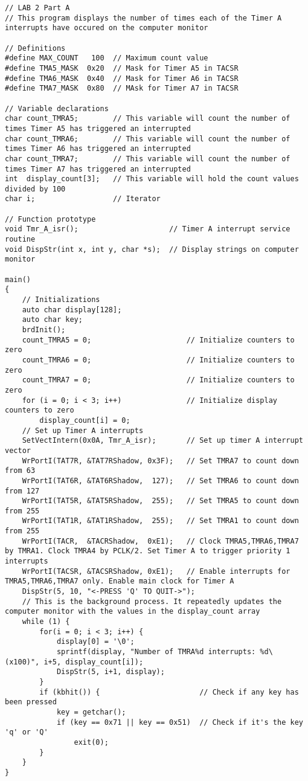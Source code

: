 
\begin{lstlisting}[frame=single]
// LAB 2 Part A 
// This program displays the number of times each of the Timer A interrupts have occured on the computer monitor

// Definitions
#define MAX_COUNT   100  // Maximum count value
#define TMA5_MASK  0x20  // Mask for Timer A5 in TACSR
#define TMA6_MASK  0x40  // Mask for Timer A6 in TACSR
#define TMA7_MASK  0x80  // MAsk for Timer A7 in TACSR

// Variable declarations
char count_TMRA5;        // This variable will count the number of times Timer A5 has triggered an interrupted
char count_TMRA6;        // This variable will count the number of times Timer A6 has triggered an interrupted
char count_TMRA7;        // This variable will count the number of times Timer A7 has triggered an interrupted
int  display_count[3];   // This variable will hold the count values divided by 100
char i;                  // Iterator

// Function prototype
void Tmr_A_isr();                     // Timer A interrupt service routine
void DispStr(int x, int y, char *s);  // Display strings on computer monitor

main()
{
    // Initializations
    auto char display[128];
    auto char key;
    brdInit();
    count_TMRA5 = 0;                      // Initialize counters to zero
    count_TMRA6 = 0;                      // Initialize counters to zero
    count_TMRA7 = 0;                      // Initialize counters to zero
    for (i = 0; i < 3; i++)               // Initialize display counters to zero
        display_count[i] = 0;
    // Set up Timer A interrupts
    SetVectIntern(0x0A, Tmr_A_isr);       // Set up timer A interrupt vector
    WrPortI(TAT7R, &TAT7RShadow, 0x3F);   // Set TMRA7 to count down from 63
    WrPortI(TAT6R, &TAT6RShadow,  127);   // Set TMRA6 to count down from 127
    WrPortI(TAT5R, &TAT5RShadow,  255);   // Set TMRA5 to count down from 255
    WrPortI(TAT1R, &TAT1RShadow,  255);   // Set TMRA1 to count down from 255
    WrPortI(TACR,  &TACRShadow,  0xE1);   // Clock TMRA5,TMRA6,TMRA7 by TMRA1. Clock TMRA4 by PCLK/2. Set Timer A to trigger priority 1 interrupts
    WrPortI(TACSR, &TACSRShadow, 0xE1);   // Enable interrupts for TMRA5,TMRA6,TMRA7 only. Enable main clock for Timer A
    DispStr(5, 10, "<-PRESS 'Q' TO QUIT->");
    // This is the background process. It repeatedly updates the computer monitor with the values in the display_count array
    while (1) {
        for(i = 0; i < 3; i++) {
            display[0] = '\0';
            sprintf(display, "Number of TMRA%d interrupts: %d\  (x100)", i+5, display_count[i]);
            DispStr(5, i+1, display);
        }
        if (kbhit()) {                       // Check if any key has been pressed
            key = getchar();
            if (key == 0x71 || key == 0x51)  // Check if it's the key 'q' or 'Q'
                exit(0);
        }
    }
}


\end{lstlisting}
